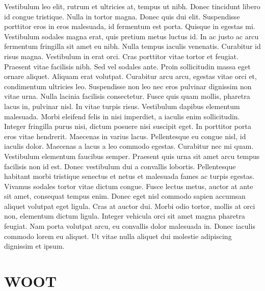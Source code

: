 \documentclass[a4paper, 12pt, twoside]{book}
\begin{document}
Vestibulum leo elit, rutrum et ultricies at, tempus ut nibh. Donec tincidunt libero id congue tristique. Nulla in tortor magna. Donec quis dui elit. Suspendisse porttitor eros in eros malesuada, id fermentum est porta. Quisque in egestas mi. Vestibulum sodales magna erat, quis pretium metus luctus id. In ac justo ac arcu fermentum fringilla sit amet eu nibh. Nulla tempus iaculis venenatis. Curabitur id risus magna. Vestibulum in erat orci. Cras porttitor vitae tortor et feugiat. Praesent vitae facilisis nibh. Sed vel sodales ante. Proin sollicitudin massa eget ornare aliquet. Aliquam erat volutpat. Curabitur arcu arcu, egestas vitae orci et, condimentum ultricies leo. Suspendisse non leo nec eros pulvinar dignissim non vitae urna. Nulla lacinia facilisis consectetur. Fusce quis quam mollis, pharetra lacus in, pulvinar nisl. In vitae turpis risus. Vestibulum dapibus elementum malesuada. Morbi eleifend felis in nisi imperdiet, a iaculis enim sollicitudin. Integer fringilla purus nisi, dictum posuere nisi suscipit eget. In porttitor porta eros vitae hendrerit. Maecenas in varius lacus. Pellentesque eu congue nisl, id iaculis dolor. Maecenas a lacus a leo commodo egestas. Curabitur nec mi quam. Vestibulum elementum faucibus semper. Praesent quis urna sit amet arcu tempus facilisis non id est. Donec vestibulum dui a convallis lobortis. Pellentesque habitant morbi tristique senectus et netus et malesuada fames ac turpis egestas. Vivamus sodales tortor vitae dictum congue. Fusce lectus metus, auctor at ante sit amet, consequat tempus enim. Donec eget nisl commodo sapien accumsan aliquet volutpat eget ligula. Cras at auctor dui. Morbi odio tortor, mollis at orci non, elementum dictum ligula. Integer vehicula orci sit amet magna pharetra feugiat. Nam porta volutpat arcu, eu convallis dolor malesuada in. Donec iaculis commodo lorem eu aliquet. Ut vitae nulla aliquet dui molestie adipiscing dignissim et ipsum.

\section{WOOT}
\end{document}
